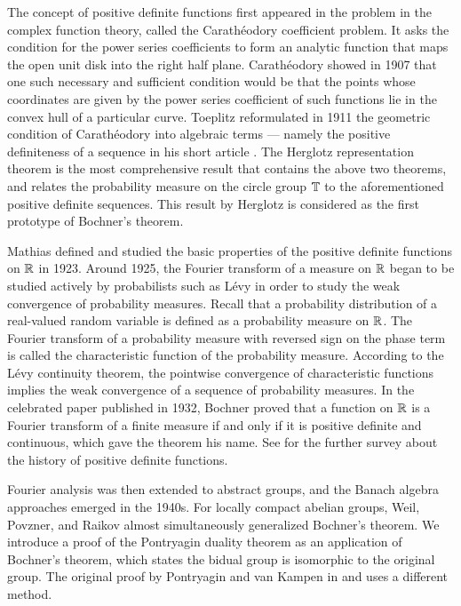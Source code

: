 \documentclass{../../small}
\begin{document}
The concept of positive definite functions first appeared in the problem in the complex function theory, called the Carath\'eodory coefficient problem.
It asks the condition for the power series coefficients to form an analytic function that maps the open unit disk into the right half plane.
Carath\'eodory \cite{caratheodory1907variabilitatsbereich} showed in 1907 that one such necessary and sufficient condition would be that the points whose coordinates are given by the power series coefficient of such functions lie in the convex hull of a particular curve.
Toeplitz reformulated in 1911 the geometric condition of Carath\'eodory into algebraic terms --- namely the positive definiteness of a sequence in his short article \cite{toeplitz1911fourier}.
The Herglotz representation theorem is the most comprehensive result that contains the above two theorems, and relates the probability measure on the circle group $\mathbb{T}$ to the aforementioned positive definite sequences.
This result by Herglotz \cite{herglotz1911uber} is considered as the first prototype of Bochner's theorem.

Mathias \cite{mathias1923positive} defined and studied the basic properties of the positive definite functions on $\mathbb{R}$ in 1923.
Around 1925, the Fourier transform of a measure on $\mathbb{R}$ began to be studied actively by probabilists such as L\'evy in order to study the weak convergence of probability measures.
Recall that a probability distribution of a real-valued random variable is defined as a probability measure on $\mathbb{R}$.
The Fourier transform of a probability measure with reversed sign on the phase term is called the characteristic function of the probability measure.
According to the L\'evy continuity theorem, the pointwise convergence of characteristic functions implies the weak convergence of a sequence of probability measures.
In the celebrated paper \cite{bochner1932vorlesungen} published in 1932, Bochner proved that a function on $\mathbb{R}$ is a Fourier transform of a finite measure if and only if it is positive definite and continuous, which gave the theorem his name.
See \cite{stewart1976positive} for the further survey about the history of positive definite functions.

Fourier analysis was then extended to abstract groups, and the Banach algebra approaches emerged in the 1940s.
For locally compact abelian groups, Weil, Povzner, and Raikov almost simultaneously generalized Bochner's theorem.
We introduce a proof of the Pontryagin duality theorem as an application of Bochner's theorem, which states the bidual group is isomorphic to the original group.
The original proof by Pontryagin and van Kampen in \cite{pontrjagin1934theory} and \cite{van1935locally} uses a different method.
\end{document}
